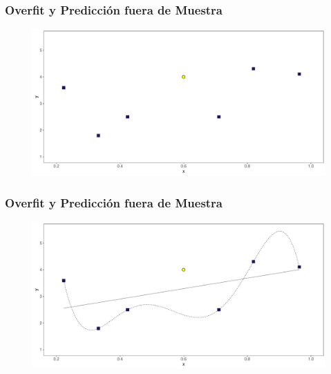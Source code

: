 \documentclass[
  shownotes,
  xcolor={svgnames},
  hyperref={colorlinks,citecolor=DarkBlue,linkcolor=andesred,urlcolor=DarkBlue}
  , aspectratio=169]{beamer}
\begin{document}
\begin{frame}
\frametitle{Overfit y Predicción fuera de Muestra}


        \begin{figure}[H] \centering
            \captionsetup{justification=centering}
              \includegraphics[scale=0.4]{figures/fig_all_sample.pdf}
 \end{figure}

\end{frame}

\begin{frame}
\frametitle{Overfit y Predicción fuera de Muestra}


        \begin{figure}[H] \centering
            \captionsetup{justification=centering}
              \includegraphics[scale=0.4]{figures/fig_all_sample_polys.pdf}
 \end{figure}


\end{frame}
\end{document}
